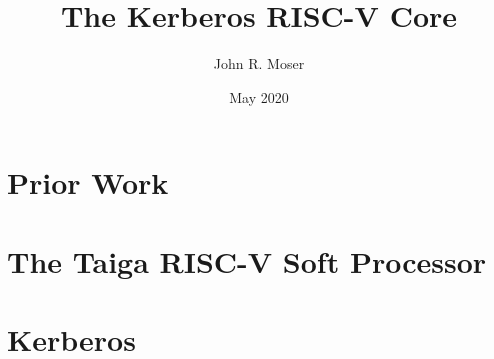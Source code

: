 \documentclass[a4paper,12pt]{book}
\begin{document}
\author{John R. Moser}
\title{The Kerberos RISC-V Core}
\date{May 2020}

\frontmatter
\maketitle

\cleardoublepage
\tableofcontents

\mainmatter
\part{Prior Work}




\part{The Taiga RISC-V Soft Processor}

\part{Kerberos}



\backmatter
\end{document}
